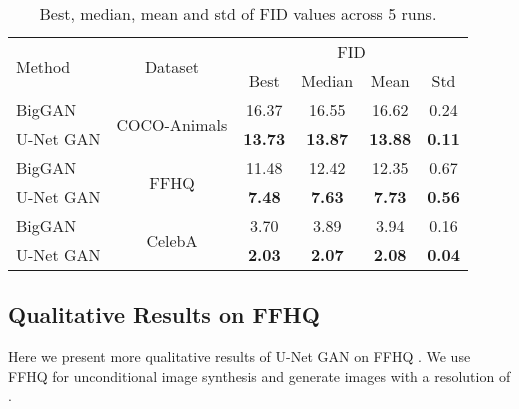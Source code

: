 \documentclass[10pt,twocolumn,letterpaper]{article}
\begin{document}
 \begin{table}[t]
	\vspace{-0em}
	\setlength{\tabcolsep}{0.5em}
	\renewcommand{\arraystretch}{0.8}
	\centering


\begin{tabular}{l c c c  c  c }
    \multirow{2}{*}{\footnotesize Method}    & \multirow{2}{*}{ \footnotesize Dataset} & \multicolumn{4}{c}{ \footnotesize FID} \\
       &  &  \footnotesize Best &  \footnotesize Median &  \footnotesize Mean  &  \footnotesize Std \\
    	\hline

  	\footnotesize BigGAN    & \multirow{2}{*}{ \footnotesize COCO-Animals} & \footnotesize 16.37 & \footnotesize 16.55 & \footnotesize 16.62 & \footnotesize 0.24 \\
     	\footnotesize U-Net GAN &  & \footnotesize  \textbf{13.73} & \footnotesize \textbf{13.87} & \footnotesize \textbf{13.88} & \footnotesize \textbf{0.11} \\
    	\hline
    	\footnotesize BigGAN    &  \multirow{2}{*}{ \footnotesize FFHQ}   & \footnotesize  11.48 & \footnotesize 12.42 & \footnotesize 12.35 & \footnotesize 0.67 \\
     	\footnotesize U-Net GAN &   & \footnotesize  \textbf{7.48}  & \footnotesize \textbf{7.63}  & \footnotesize \textbf{7.73}  & \footnotesize \textbf{0.56} \\
	\hline
      	\footnotesize BigGAN    &  \multirow{2}{*}{ \footnotesize CelebA}   & \footnotesize  3.70 & \footnotesize 3.89 & \footnotesize 3.94 & \footnotesize 0.16 \\
      	\footnotesize U-Net GAN &   & \footnotesize  \textbf{2.03}  & \footnotesize \textbf{2.07}  & \footnotesize \textbf{2.08}  & \footnotesize \textbf{0.04} \\
	\end{tabular}
	\caption{ Best, median, mean and std of FID values across 5 runs.} \label{table:fids_long}
	\vspace{-1.5em}
\end{table}
 

 \subsection{Qualitative Results on FFHQ}\label{sec:syn samples_ffhq}
Here we present more qualitative results of U-Net GAN on FFHQ \cite{Karras2018ASG}.
We use FFHQ for unconditional image synthesis and generate images with a resolution of .
\end{document}
